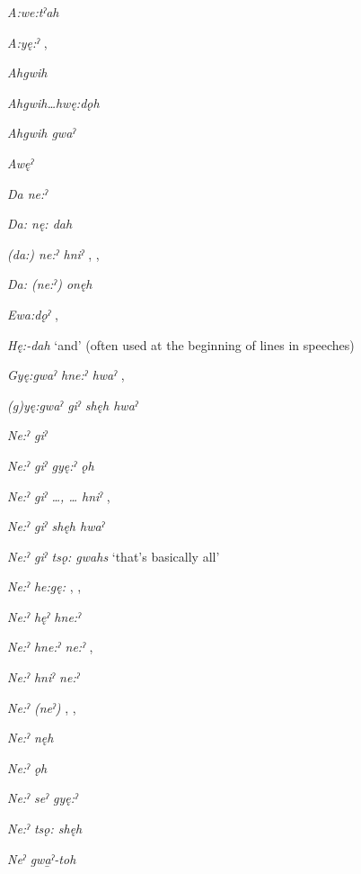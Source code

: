 \ea
\label{ex:particleclauseorder8}
\begin{multicols}{2}

\textit{A:we:tˀah} 

\textit{A:yę:ˀ} , 

\textit{Ahgwih} 

\textit{Ahgwih…hwę:dǫh} 

\textit{Ahgwih gwaˀ} 

\textit{Awęˀ} 

\textit{Da ne:ˀ} 

\textit{Da: nę: dah} 

\textit{(da:) ne:ˀ hniˀ} , , 

\textit{Da: (ne:ˀ) onęh} 

\textit{Ewa:dǫˀ} , 

\textit{Hę:-dah} ‘and’ (often used at the beginning of lines in speeches)

\textit{Gyę:gwaˀ hne:ˀ hwaˀ} , 

\textit{(g)yę:gwaˀ giˀ shęh hwaˀ} 

\textit{Ne:ˀ giˀ} 

\textit{Ne:ˀ giˀ gyę:ˀ ǫh} 

\textit{Ne:ˀ giˀ …, … hniˀ} , 

\textit{Ne:ˀ giˀ shęh hwaˀ} 

\textit{Ne:ˀ giˀ tsǫ: gwahs} ‘that’s basically all’

\textit{Ne:ˀ he:gę:} , , 

\textit{Ne:ˀ hęˀ hne:ˀ} 

\textit{Ne:ˀ hne:ˀ ne:ˀ} , 

\textit{Ne:ˀ hniˀ ne:ˀ} 

\textit{Ne:ˀ (neˀ)} , , 

\textit{Ne:ˀ nęh} 

\textit{Ne:ˀ ǫh} 

\textit{Ne:ˀ seˀ gyę:ˀ} 

\textit{Ne:ˀ tsǫ: shęh} 

\textit{Neˀ gwa̱ˀ-toh} 


\end{multicols}
